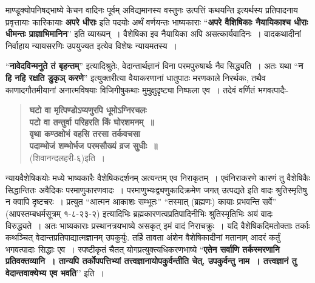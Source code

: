 {माण्डूक्योपनिषद्भाष्ये केचन वादिनः पूर्वम् अविद्यमानस्य वस्तुनः उत्पत्तिं कथयन्ति इत्यर्थस्य प्रतिपादनाय प्रवृत्तायाः कारिकायाः \textbf{अपरे धीराः} इति पदयोः अर्थं वर्णयन्तः भाष्यकाराः “\textbf{अपरे वैशिषिकाः नैयायिकाश्च धीराः धीमन्तः प्राज्ञाभिमानिन}” इति व्याख्यन्~। वैशेषिका इव नैयायिका अपि असत्कार्यवादिनः~। वादकथादीनां निर्वाहाय न्यायसरणिः उपयुज्यत इत्येव विशेषः न्यायमतस्य~। 

“\textbf{नावेदविन्मनुते तं बृहन्तम्}” इत्यादिश्रुतेः, वेदान्तार्थज्ञानं विना परमपुरुषार्थः नैव सिद्ध्यति~। अतः यथा “\textbf{न हि नहि रक्षति डुकृञ् करणे}” इत्युक्तरीत्या वैयाकरणानां धातुपाठः मरणकाले निरर्थकः, तथैव काणादगौतमीयानां अनात्मविषयाः विजिगीषुकथाः मुमुक्षुदृष्ट्या निष्फला एव~। तदेवं वर्णितं भगवत्पादैः-
\begin{verse}
\textbf{घटो वा मृत्पिण्डोऽप्यणुरपि धूमोऽग्निरचलः\\
पटो वा तन्तुर्वा परिहरति किं घोरशमनम्~॥\\
वृथा कण्ठक्षोभं वहसि तरसा तर्कवचसा\\
पदाम्भोजं शम्भोर्भज परमसौख्यं व्रज सुधीः~॥}\\
\hspace{5cm}(शिवानन्दलहरी-६)इति~। 
\end{verse}
न्यायवैशेषिकयोः मध्ये भाष्यकारैः वैशेषिकदर्शनम् अत्यन्तम् एव निराकृतम्~। एवं\break निराकरणे कारणं तु वैशेषिकैः सिद्धान्तितः अवैदिकः परमाणुकारणवादः~। परमाणुभ्यः\break द्व्यणुकादिक्रमेण जगत् उत्पद्यते इति वादः श्रुतिस्मृतिषु न क्वापि दृष्टचरः~। प्रत्युत “आत्मन आकाशः सम्भूतः” “तस्मात् (ब्रह्मणः) कायाः प्रभवन्ति सर्वे” (आपस्तम्बधर्मसूत्रम् १-८-२३-२) इत्यादिभिः ब्रह्मकारणत्वप्रतिपादिनीभिः श्रुतिस्मृतिभिः अयं वादः विरुद्ध्यते~। अतः भाष्यकाराः प्रस्थानत्रयभाष्ये असकृत् इमं वादं निराचक्रुः~। यदि वैशेषिकदि\-मतोक्ताः तर्काः कथञ्चित् वेदान्तप्रतिपाद्यात्मज्ञानम् उपकुर्युः. तर्हि तावता अंशेन वैशेषिकादीनां मतानाम् आदरं कर्तुं भगवत्पादाः सिद्धाः एव~। स्पष्टीकृतं चैतत् योगप्रत्युक्त्यधिकरणभाष्ये “\textbf{एतेन सर्वाणि तर्कस्मरणानि प्रतिवक्तव्यानि~। तान्यपि तर्कोपपत्तिभ्यां तत्त्वज्ञानायोपकुर्वन्तीति चेत्, उपकुर्वन्तु नाम~। तत्त्वज्ञानं तु वेदान्तवाक्येभ्य एव भवति}’’ इति~। 

\articleend
}
